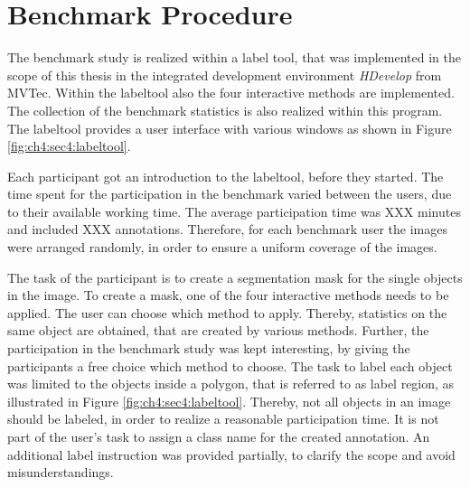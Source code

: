 
\section{Benchmark Procedure}\label{ord:ch4:sec5}
% 
The benchmark study is realized within a label tool, that was implemented in the scope of this thesis in the integrated development environment \textit{HDevelop} from MVTec.
Within the labeltool also the four interactive methods are implemented.
The collection of the benchmark statistics is also realized within this program.
The labeltool provides a user interface with various windows as shown in Figure \ref{fig:ch4:sec4:labeltool}.

Each participant got an introduction to the labeltool, before they started.
The time spent for the participation in the benchmark varied between the users, due to their available working time. %
The average participation time was XXX minutes and included XXX annotations.
Therefore, for each benchmark user the images were arranged randomly, in order to ensure a uniform coverage of the images.

The task of the participant is to create a segmentation mask for the single objects in the image.
To create a mask, one of the four interactive methods needs to be applied.
The user can choose which method to apply.
Thereby, statistics on the same object are obtained, that are created by various methods.
Further, the participation in the benchmark study was kept interesting, by giving the participants a free choice which method to choose.
The task to label each object was limited to the objects inside a polygon, that is referred to as label region, as illustrated in Figure \ref{fig:ch4:sec4:labeltool}.
Thereby, not all objects in an image should be labeled, in order to realize a reasonable participation time.
It is not part of the user's task to assign a class name for the created annotation.
An additional label instruction was provided partially, to clarify the scope and avoid misunderstandings.

